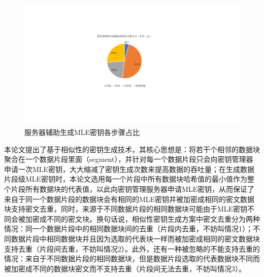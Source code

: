 \documentclass[promaster]{thesis-uestc}
\begin{document}
\begin{figure}[htbp]
    \centering
    \includegraphics[width = 0.55\linewidth]{pic/服务器辅助生成MLE密钥各步骤占比.pdf}
    \caption{服务器辅助生成MLE密钥各步骤占比}
    \label{服务器辅助生成MLE密钥各步骤占比}
\end{figure}

本论文提出了基于相似性的密钥生成技术，其核心思想是：将若干个相邻的数据块聚合在一个数据片段里面（segment），并针对每一个数据片段只会向密钥管理器申请一次MLE密钥，大大缩减了密钥生成次数来提高数据的吞吐量；在生成数据片段级MLE密钥时，本论文选用每一个片段中所有数据块哈希值的最小值作为整个片段所有数据块的代表值，以此向密钥管理服务器申请MLE密钥，从而保证了来自于同一个数据片段的数据块会有相同的MLE密钥并被加密成相同的密文数据块支持密文去重，同时，来源于不同数据片段的相同数据块可能由于MLE密钥不同会被加密成不同的密文块。换句话说，相似性密钥生成方案中密文去重分为两种情况：同一个数据片段中的相同数据块间的去重（片段内去重，不妨叫情况1）；不同数据片段中相同数据块并且因为选取的代表块一样而被加密成相同的密文数据块支持去重（片段间去重，不妨叫情况2）。此外，还有一种被忽略的不能支持去重的情况：来自于不同数据片段的相同数据块，但是数据片段选取的代表数据块不同而被加密成不同的数据块密文而不支持去重（片段间无法去重，不妨叫情况3）。
\end{document}
